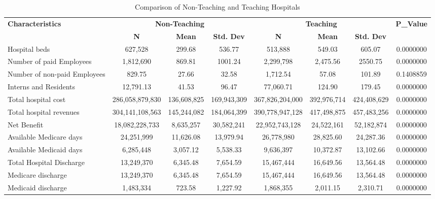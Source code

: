 \documentclass{article}
\begin{document}
	
	\begin{landscape}
		\begin{table}[ht]
			\centering
			\begin{tabular}{lccccccc}
				\toprule
				\textbf{Characteristics} & \multicolumn{3}{c}{\textbf{Non-Teaching}} & \multicolumn{3}{c}{\textbf{Teaching}} & \textbf{P\_Value} \\
				\cmidrule(lr){2-4} \cmidrule(lr){5-7} \cmidrule(lr){8-8}
				& \textbf{N} & \textbf{Mean} & \textbf{Std. Dev} & \textbf{N} & \textbf{Mean} & \textbf{Std. Dev} & \\
				\midrule
				Hospital beds            & 627,528    & 299.68        & 536.77             & 513,888    & 549.03        & 605.07 & 0.0000000 \\
				Number of paid Employees & 1,812,690  & 869.81        & 1001.24            & 2,299,798  & 2,475.56      & 2550.75 & 0.0000000 \\
				Number of non-paid Employees & 829.75 & 27.66         & 32.58              & 1,712.54   & 57.08         & 101.89 & 0.1408859 \\
				Interns and Residents    & 12,791.13  & 41.53         & 96.47              & 77,060.71  & 124.90        & 179.45 & 0.0000000 \\
				Total hospital cost      & 286,058,879,830 & 136,608,825  & 169,943,309    & 367,826,204,000 & 392,976,714 & 424,408,629 & 0.0000000 \\
				Total hospital revenues  & 304,141,108,563 & 145,244,082  & 184,064,399    & 390,778,947,128 & 417,498,875 & 457,483,256 & 0.0000000 \\
				Net Benefit              & 18,082,228,733 & 8,635,257     & 30,582,241     & 22,952,743,128 & 24,522,161  & 52,182,874 & 0.0000000 \\
				Available Medicare days  & 24,251,999 & 11,626.08      & 13,979.94        & 26,778,980    & 28,825.60   & 24,287.36 & 0.0000000 \\
				Available Medicaid days & 6,285,448 & 3,057.12       & 5,538.33         & 9,636,397     & 10,372.87   & 13,102.66 & 0.0000000 \\
				Total Hospital Discharge & 13,249,370 & 6,345.48     & 7,654.59         & 15,467,444    & 16,649.56   & 13,564.48 & 0.0000000 \\
				Medicare discharge       & 13,249,370 & 6,345.48     & 7,654.59         & 15,467,444    & 16,649.56   & 13,564.48 & 0.0000000 \\
				Medicaid discharge       & 1,483,334  & 723.58       & 1,227.92         & 1,868,355     & 2,011.15    & 2,310.71 & 0.0000000 \\
				\bottomrule
			\end{tabular}
			\caption{Comparison of Non-Teaching and Teaching Hospitals}
			\label{tab:hospital_comparison}
		\end{table}
		

\end{landscape}
\end{document}

